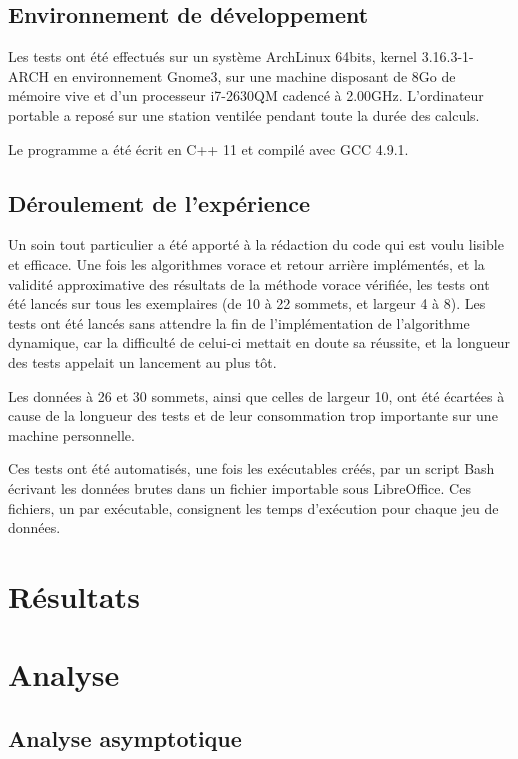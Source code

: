 \documentclass[10pt,a4paper]{article}
\begin{document}
\subsection{Environnement de développement}

Les tests ont été effectués sur un système ArchLinux 64bits, kernel 3.16.3-1-ARCH en environnement Gnome3, sur une machine disposant de 8Go de mémoire vive et d'un processeur i7-2630QM cadencé à 2.00GHz. L'ordinateur portable a reposé sur une station ventilée pendant toute la durée des calculs.

Le programme a été écrit en C++ 11 et compilé avec GCC 4.9.1.

\subsection{Déroulement de l'expérience}

Un soin tout particulier a été apporté à la rédaction du code qui est voulu lisible et efficace.
Une fois les algorithmes vorace et retour arrière implémentés, et la validité approximative des résultats de la méthode vorace vérifiée, les tests ont été lancés sur tous les exemplaires (de 10 à 22 sommets, et largeur 4 à 8). Les tests ont été lancés sans attendre la fin de l'implémentation de l'algorithme dynamique, car la difficulté de celui-ci mettait en doute sa réussite, et la longueur des tests appelait un lancement au plus tôt.

Les données à 26 et 30 sommets, ainsi que celles de largeur 10, ont été écartées à cause de la longueur des tests et de leur consommation trop importante sur une machine personnelle.

Ces tests ont été automatisés, une fois les exécutables créés, par un script Bash écrivant les données brutes dans un fichier importable sous LibreOffice. Ces fichiers, un par exécutable, consignent les temps d'exécution pour chaque jeu de données.

\section{Résultats}

\section{Analyse}

\subsection{Analyse asymptotique}
\end{document}

